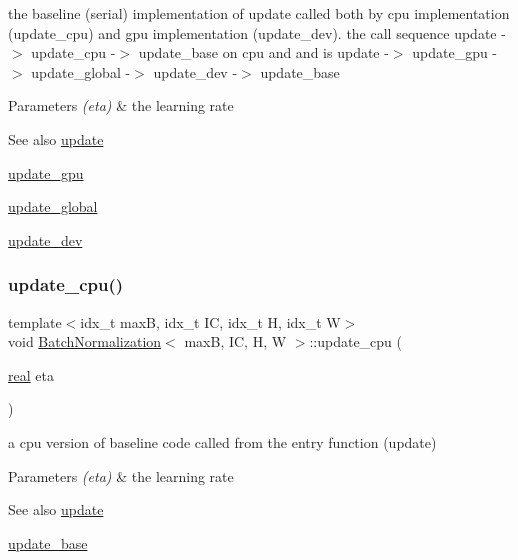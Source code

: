 the baseline (serial) implementation of update called both by cpu implementation (update\+\_\+cpu) and gpu implementation (update\+\_\+dev). the call sequence update -\/$>$ update\+\_\+cpu -\/$>$ update\+\_\+base on cpu and and is update -\/$>$ update\+\_\+gpu -\/$>$ update\+\_\+global -\/$>$ update\+\_\+dev -\/$>$ update\+\_\+base 


\begin{DoxyParams}{Parameters}
{\em (eta)} & the learning rate \\
\hline
\end{DoxyParams}
\begin{DoxySeeAlso}{See also}
\hyperlink{structBatchNormalization_a71b4c3d0b5002d84ba2d74f47f7ab8d2}{update} 

\hyperlink{structBatchNormalization_a1e65c4b6e011da3e8176e56ccb83e453}{update\+\_\+gpu} 

\hyperlink{linear_8h_a810703be28422bb9483665cbdbafd968}{update\+\_\+global} 

\hyperlink{structBatchNormalization_a463e10e6b59905d8c1e9bcac3a17a126}{update\+\_\+dev} 
\end{DoxySeeAlso}
\mbox{\label{structBatchNormalization_a223b6369246bad1525c2284a0285c581}} 
\subsubsection{\texorpdfstring{update\+\_\+cpu()}{update\_cpu()}}
{\footnotesize\ttfamily template$<$idx\+\_\+t maxB, idx\+\_\+t IC, idx\+\_\+t H, idx\+\_\+t W$>$ \\
void \hyperlink{structBatchNormalization}{Batch\+Normalization}$<$ maxB, IC, H, W $>$\+::update\+\_\+cpu (\begin{DoxyParamCaption}\item[{\hyperlink{vgg__util_8h_a1082d08aaa761215ec83e7149f27ad16}{real}}]{eta }\end{DoxyParamCaption})\hspace{0.3cm}{\ttfamily [inline]}}



a cpu version of baseline code called from the entry function (update) 


\begin{DoxyParams}{Parameters}
{\em (eta)} & the learning rate \\
\hline
\end{DoxyParams}
\begin{DoxySeeAlso}{See also}
\hyperlink{structBatchNormalization_a71b4c3d0b5002d84ba2d74f47f7ab8d2}{update} 

\hyperlink{structBatchNormalization_a757cb54212040fca8bc2465bbac26636}{update\+\_\+base} 
\end{DoxySeeAlso}
\mbox{\label{structBatchNormalization_a463e10e6b59905d8c1e9bcac3a17a126}} 
